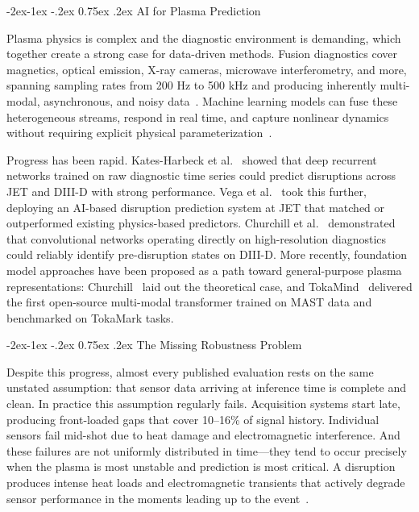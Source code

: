 \documentclass[10pt,twocolumn]{article}
\makeatletter
\renewcommand\subsection{\@startsection{subsection}{2}{\z@}%
  {-2ex\@plus -1ex \@minus -.2ex}%
  {0.75ex \@plus .2ex}%
  {\normalfont\large\bfseries}}
\makeatother
\begin{document}
\subsection{AI for Plasma Prediction}

Plasma physics is complex and the diagnostic environment is demanding,
which together create a strong case for data-driven methods. Fusion
diagnostics cover magnetics, optical emission, X-ray cameras, microwave
interferometry, and more, spanning sampling rates from 200 Hz to 500 kHz
and producing inherently multi-modal, asynchronous, and noisy
data~\cite{morris2002}. Machine learning models can fuse these
heterogeneous streams, respond in real time, and capture nonlinear
dynamics without requiring explicit physical parameterization~\cite{churchill2025}.

Progress has been rapid. Kates-Harbeck et al.~\cite{katesharbeck2019}
showed that deep recurrent networks trained on raw diagnostic time series
could predict disruptions across JET and DIII-D with strong performance.
Vega et al.~\cite{vega2022} took this further, deploying an AI-based
disruption prediction system at JET that matched or outperformed existing
physics-based predictors. Churchill et al.~\cite{churchill2020} demonstrated
that convolutional networks operating directly on high-resolution
diagnostics could reliably identify pre-disruption states on DIII-D.
More recently, foundation model approaches have been proposed as a
path toward general-purpose plasma representations: Churchill~\cite{churchill2025}
laid out the theoretical case, and TokaMind~\cite{boschi2026tokamind}
delivered the first open-source multi-modal transformer trained on MAST
data and benchmarked on TokaMark tasks.

\subsection{The Missing Robustness Problem}

Despite this progress, almost every published evaluation rests on the
same unstated assumption: that sensor data arriving at inference time
is complete and clean. In practice this assumption regularly fails.
Acquisition systems start late, producing front-loaded gaps that cover
10--16\% of signal history. Individual sensors fail mid-shot due to
heat damage and electromagnetic interference. And these failures are
not uniformly distributed in time—they tend to occur precisely when
the plasma is most unstable and prediction is most critical. A
disruption produces intense heat loads and electromagnetic transients
that actively degrade sensor performance in the moments leading up to
the event~\cite{rousseau2026tokamark, jackson2025ieee}.
\end{document}
